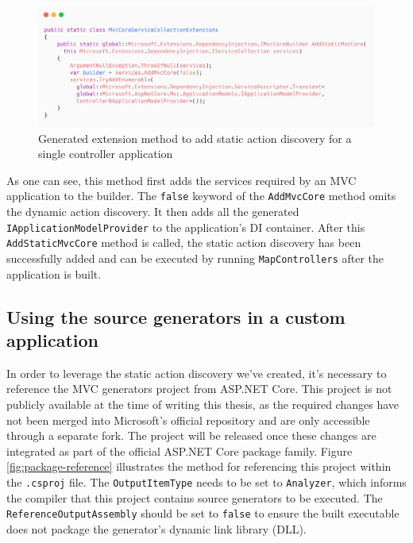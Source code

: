 \begin{figure}[H]
\centering
\includegraphics[width=\linewidth]{graphics/add-static-mvc-core.png}
\caption{Generated extension method to add static action discovery for a single controller application}
\label{fig:add-static-mvc}
\end{figure}

As one can see, this method first adds the services required by an MVC application to the builder. The \texttt{false} keyword of the \texttt{AddMvcCore} method omits the dynamic action discovery. It then adds all the generated \texttt{IApplicationModelProvider} to the application's DI container. After this \texttt{AddStaticMvcCore} method is called, the static action discovery has been successfully added and can be executed by running \texttt{MapControllers} after the application is built.

\subsection{Using the source generators in a custom application}

In order to leverage the static action discovery we've created, it's necessary to reference the MVC generators project from ASP.NET Core. This project is not publicly available at the time of writing this thesis, as the required changes have not been merged into Microsoft's official repository and are only accessible through a separate fork. The project will be released once these changes are integrated as part of the official ASP.NET Core package family. Figure \ref{fig:package-reference} illustrates the method for referencing this project within the \texttt{.csproj} file. The \texttt{OutputItemType} needs to be set to \texttt{Analyzer}, which informs the compiler that this project contains source generators to be executed. The \texttt{ReferenceOutputAssembly} should be set to \texttt{false} to ensure the built executable does not package the generator's dynamic link library (DLL).

